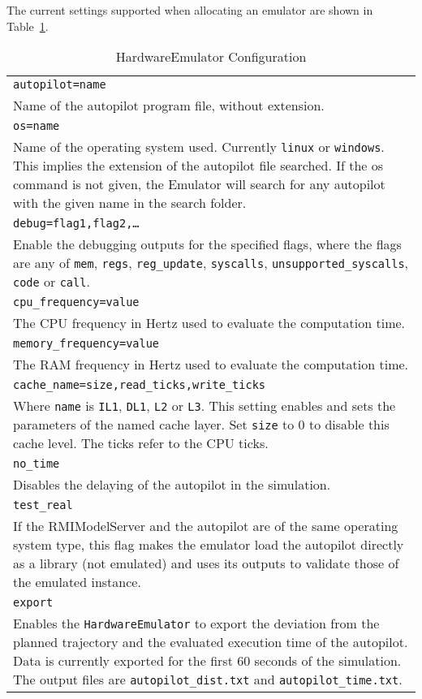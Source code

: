 The current settings supported when allocating an emulator are shown in Table~\ref{tab:emuconfig}.
\begin{table}[!htb]
    \begin{tabularx}{\textwidth}{ | X |}
        \hline
        \texttt{autopilot=name} \\
        Name of the autopilot program file, without extension.\\ \hline
        \texttt{os=name} \\
        Name of the operating system used. Currently \texttt{linux} or \texttt{windows}. This implies the extension of the autopilot file searched. If the os command is not given, the Emulator will search for any autopilot with the given name in the search folder. \\ \hline
        \texttt{debug=flag1,flag2,\dots} \\
        Enable the debugging outputs for the specified flags, where the flags are any of \texttt{mem}, \texttt{regs}, \texttt{reg\_update}, \texttt{syscalls}, \texttt{unsupported\_syscalls}, \texttt{code} or \texttt{call}. \\\hline
        \texttt{cpu\_frequency=value} \\
        The CPU frequency in Hertz used to evaluate the computation time. \\\hline
        \texttt{memory\_frequency=value} \\
        The RAM frequency in Hertz used to evaluate the computation time. \\\hline
        \texttt{cache\_name=size,read\_ticks,write\_ticks} \\
        Where \texttt{name} is \texttt{IL1}, \texttt{DL1}, \texttt{L2} or \texttt{L3}.
        This setting enables and sets the parameters of the named cache layer. Set \texttt{size} to 0 to disable this cache level. The ticks refer to the CPU ticks.\\\hline
        \texttt{no\_time} \\
        Disables the delaying of the autopilot in the simulation. \\\hline
        \texttt{test\_real} \\
        If the RMIModelServer and the autopilot are of the same operating system type, this flag makes the emulator load the autopilot directly as a library (not emulated) and uses its outputs to validate those of the emulated instance. \\
        \texttt{export} \\
        Enables the \texttt{HardwareEmulator} to export the deviation from the planned trajectory and the evaluated execution time of the autopilot. Data is currently exported for the first 60 seconds of the simulation. The output files are \texttt{autopilot\_dist.txt} and \texttt{autopilot\_time.txt}.
        \\\hline
    \end{tabularx}
    \caption{HardwareEmulator Configuration}
    \label{tab:emuconfig}
\end{table}

